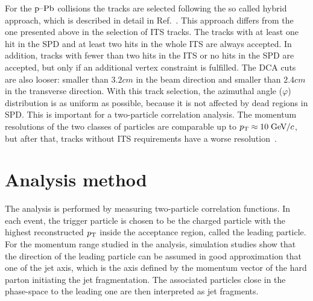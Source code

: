 For the $\mbox{p--Pb}$ collisions the tracks are selected following the so called hybrid approach, which is described in detail in Ref.~\cite{hybridExplanation}. This approach differs from the one presented above in the selection of ITS tracks. The tracks with at least one hit in the SPD and at least two hits in the whole ITS are always accepted. In addition, tracks with fewer than two hits in the ITS or no hits in the SPD are accepted, but only if an additional vertex constraint is fulfilled. The DCA cuts are also looser: smaller than $\unit{3.2}{cm}$ in the beam direction and smaller than $\unit{2.4}{cm}$ in the transverse direction. With this track selection, the azimuthal angle ($\varphi$) distribution is as uniform as possible, because it is not affected by dead regions in SPD. This is important for a two-particle correlation analysis. The momentum resolutions of the two classes of particles are comparable up to $p_{\rm T} \approx 10\;\mathrm{GeV}\kern-0.05em/\kern-0.02em c$, but after that, tracks without ITS requirements have a worse resolution~\cite{alicePerformance,aliceBackgroundFluctuation}.

\section{Analysis method}
\label{sec:methods}

The analysis is performed by measuring two-particle correlation functions. In each event, the trigger particle is chosen to be the charged particle with the highest reconstructed $p_{\rm T}$ inside the acceptance region, called the leading particle. For the momentum range studied in the analysis, simulation studies show that the direction of the leading particle can be assumed in good approximation that one of the jet axis, which is the axis defined by the momentum vector of the hard parton initiating the jet fragmentation. The associated particles close in the phase-space to the leading one are then interpreted as jet fragments.

